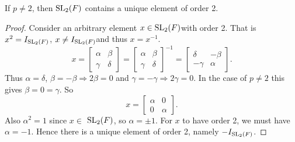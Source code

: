 \begin{lemma}
\label{SpecialSubgroups.exists_unique_orderOf_eq_two}
\leanok
    If $p\neq 2$, then $\operatorname{SL}_2(F)$ contains a unique element of order 2. \\
\end{lemma}
\begin{proof}
\leanok
Consider an arbitrary element $x \in \operatorname{SL}_2(F)$with order 2. That is $x^2 = I_{\operatorname{SL}_2(F)}$, $x \neq I_{\operatorname{SL}_2(F)}$and thus $x=x^{-1}$.
\begin{equation*} 
    x = \begin{bmatrix} \alpha & \beta \\ \gamma & \delta \end{bmatrix} = \begin{bmatrix} \alpha & \beta \\ \gamma & \delta \end{bmatrix}^{-1} = \begin{bmatrix} \delta & - \beta \\ - \gamma & \alpha \end{bmatrix}.
\end{equation*}
\noindent Thus $\alpha = \delta$, $\beta = - \beta \Rightarrow 2\beta = 0$ and $\gamma = - \gamma \Rightarrow 2\gamma = 0$. In the case of $p \neq 2$ this gives $\beta = 0 = \gamma$. So
\begin{equation*} 
    x = \begin{bmatrix} \alpha & 0 \\ 0 & \alpha \end{bmatrix}.
\end{equation*}
\noindent Also $\alpha^2 = 1$ since $x \in$ $\operatorname{SL}_2(F)$, so $\alpha = \pm 1$. For $x$ to have order 2, we must have $\alpha = - 1$. Hence there is a unique element of order 2, namely $- I_{\operatorname{SL}_2(F)}$.
\end{proof}
